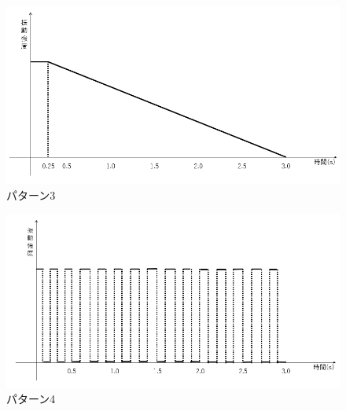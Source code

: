 \newpage
\begin{figure}[h]
\centering
\includegraphics[clip,width=14cm]{./fig/patarn3.png}
\caption{パターン3}\label{patarn3}
\end{figure}

\begin{figure}[h]
\centering
\includegraphics[clip,width=14cm]{./fig/patarn4.png}
\caption{パターン4}\label{patarn4}
\end{figure}


